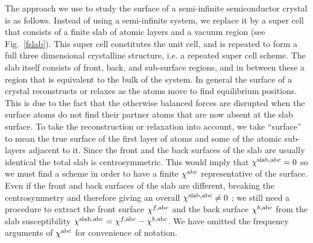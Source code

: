 \documentclass[floatfix,prb,aps,superscriptaddress,11pt,preprint,letterpaper]{revtex4}
\def\chon{black}
\begin{document}

The approach we use to study the surface of a semi-infinite
semiconductor crystal is as follows. Instead of using a
semi-infinite system, we replace it by a super cell that 
{\color{\chon} consists} of a finite
slab of atomic layers and a vacuum region (see Fig.~\ref{fslab}). This
super cell {\color{\chon} constitutes the unit cell, and}
is repeated to form a full three dimensional crystalline structure,
i.e. a repeated super cell scheme. 
The slab itself consists of {\color{\chon} front, back, and 
sub-surface} regions, and in between these
a region that is equivalent to {\color{\chon} the}
bulk of the system. 
In general the surface of a crystal reconstructs or relaxes as the atoms
move to find equilibrium positions. This is due to the fact that
the otherwise
balanced forces are disrupted when the surface atoms do not find their 
partner atoms that are now absent at the {\color{\chon} slab surface.} 
To take the reconstruction or relaxation into account, 
we take ``surface'' to mean
the true surface of the first layer of {\color{\chon} atoms} and
some of the atomic sub-layers adjacent to it.
Since the front and the back
surfaces of the slab are usually identical the total slab is
centrosymmetric. This would imply that 
$\chi^{\mathrm{slab},\mathrm{a}\mathrm{b}\mathrm{c}}=0$ {\color{\chon} so} we must
find a scheme 
in order to have a finite $\chi^{\mathrm{a}\mathrm{b}\mathrm{c}}$ representative of the
surface. Even if the front and back surfaces of the slab 
are different, breaking the centrosymmetry and therefore giving an
overall $\chi^{\mathrm{slab},\mathrm{a}\mathrm{b}\mathrm{c}}\ne 0${\color{\chon} ;} we still
need a procedure to extract the front surface $\chi^{f,\mathrm{a}\mathrm{b}\mathrm{c}}$
and the back surface $\chi^{b,\mathrm{a}\mathrm{b}\mathrm{c}}$ from the slab
susceptibility 
$\chi^{\mathrm{slab},\mathrm{a}\mathrm{b}\mathrm{c}}=\chi^{f,\mathrm{a}\mathrm{b}\mathrm{c}}-\chi^{b,\mathrm{a}\mathrm{b}\mathrm{c}}$.
We have omitted the frequency arguments of $\chi^{\mathrm{a}\mathrm{b}\mathrm{c}}$ for 
{\color{\chon} convenience of} notation.
\end{document}
